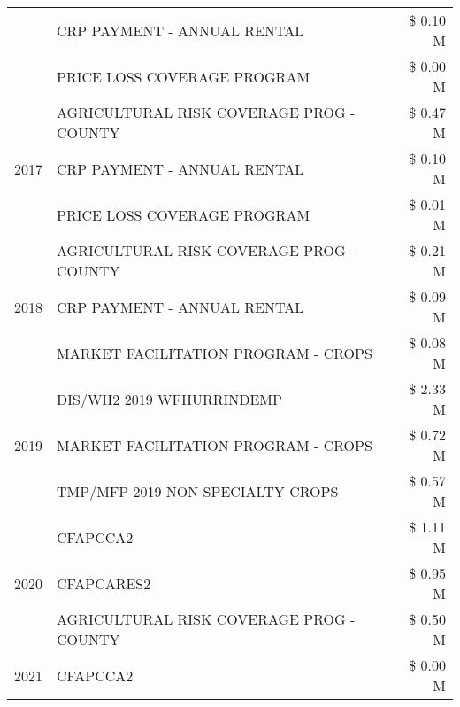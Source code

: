 \begin{tabular}{llr}
 & CRP PAYMENT - ANNUAL RENTAL & \$ 0.10 M \\
 & PRICE LOSS COVERAGE PROGRAM & \$ 0.00 M \\
\cline{1-3}
\multirow[t]{3}{*}{2017} & AGRICULTURAL RISK COVERAGE PROG - COUNTY & \$ 0.47 M \\
 & CRP PAYMENT - ANNUAL RENTAL & \$ 0.10 M \\
 & PRICE LOSS COVERAGE PROGRAM & \$ 0.01 M \\
\cline{1-3}
\multirow[t]{3}{*}{2018} & AGRICULTURAL RISK COVERAGE PROG - COUNTY & \$ 0.21 M \\
 & CRP PAYMENT - ANNUAL RENTAL & \$ 0.09 M \\
 & MARKET FACILITATION PROGRAM - CROPS & \$ 0.08 M \\
\cline{1-3}
\multirow[t]{3}{*}{2019} & DIS/WH2 2019 WFHURRINDEMP & \$ 2.33 M \\
 & MARKET FACILITATION PROGRAM - CROPS & \$ 0.72 M \\
 & TMP/MFP 2019 NON SPECIALTY CROPS & \$ 0.57 M \\
\cline{1-3}
\multirow[t]{3}{*}{2020} & CFAPCCA2 & \$ 1.11 M \\
 & CFAPCARES2 & \$ 0.95 M \\
 & AGRICULTURAL RISK COVERAGE PROG - COUNTY & \$ 0.50 M \\
\cline{1-3}
2021 & CFAPCCA2 & \$ 0.00 M \\
\cline{1-3}
\bottomrule
\end{tabular}
